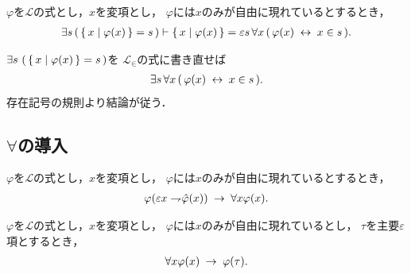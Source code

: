 	\begin{screen}
		\begin{thm}
			$\varphi$を$\mathcal{L}$の式とし，$x$を変項とし，
			$\varphi$には$x$のみが自由に現れているとするとき，
			\begin{align}
				\exists s\, (\, \left\{\, x \mid \varphi(x)\, \right\} = s\, )
				\vdash \left\{\, x \mid \varphi(x)\, \right\} = 
				\varepsilon s\, \forall x\, (\, \varphi(x) \hspace{0.25em}\leftrightarrow\hspace{0.25em} x \in s\, ).
			\end{align}
		\end{thm}
	\end{screen}
	
	\begin{sketch}
		$\exists s\, \left(\, \left\{\, x \mid \varphi(x)\, \right\} = s\, \right)$を
		$\mathcal{L}_{\in}$の式に書き直せば
		\begin{align}
			\exists s\, \forall x\, (\, \varphi(x) \hspace{0.25em}\leftrightarrow\hspace{0.25em} x \in s\, ).
		\end{align}
		存在記号の規則より結論が従う．
		\QED
	\end{sketch}
	
	\begin{comment}
	\begin{screen}
		\begin{thm}
			$\varphi$を$\mathcal{L}$の式とし，$x$を変項とし，
			$\varphi$には$x$のみが自由に現れているとするとき，
			\begin{align}
				\exists x \varphi(x) \lrarrow \varphi(\varepsilon x \hat{\varphi}(x)).
			\end{align}
		\end{thm}
	\end{screen}
	\end{comment}

\newpage
\subsection{$\forall$の導入}
	\begin{screen}
		\begin{logicalaxm}
			$\varphi$を$\mathcal{L}$の式とし，$x$を変項とし，
			$\varphi$には$x$のみが自由に現れているとするとき，
			\begin{align}
				\varphi(\varepsilon x \rightharpoondown\hspace{-0.25em} \hat{\varphi}(x))
				\hspace{0.25em}\rightarrow\hspace{0.25em} \forall x \varphi(x).
			\end{align}
		\end{logicalaxm}
	\end{screen}
	
	\begin{screen}
		\begin{logicalaxm}
			$\varphi$を$\mathcal{L}$の式とし，$x$を変項とし，
			$\varphi$には$x$のみが自由に現れているとし，
			$\tau$を主要$\varepsilon$項とするとき，
			\begin{align}
				\forall x \varphi(x) \hspace{0.25em}\rightarrow\hspace{0.25em} \varphi(\tau).
			\end{align}
		\end{logicalaxm}
	\end{screen}
	
